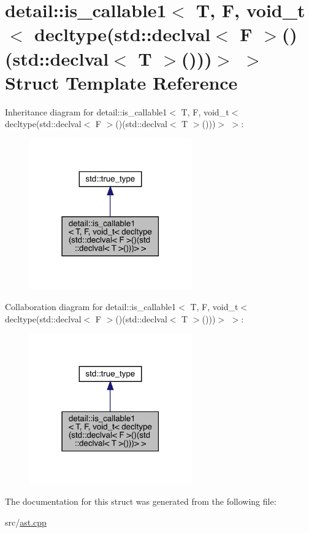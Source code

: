 \hypertarget{structdetail_1_1is__callable1_3_01_t_00_01_f_00_01void__t_3_01decltype_07std_1_1declval_3_01_f_0031734589d10bdb36da443f727c3d6f8}{}\section{detail\+:\+:is\+\_\+callable1$<$ T, F, void\+\_\+t$<$ decltype(std\+:\+:declval$<$ F $>$()(std\+:\+:declval$<$ T $>$()))$>$ $>$ Struct Template Reference}
\label{structdetail_1_1is__callable1_3_01_t_00_01_f_00_01void__t_3_01decltype_07std_1_1declval_3_01_f_0031734589d10bdb36da443f727c3d6f8}


Inheritance diagram for detail\+:\+:is\+\_\+callable1$<$ T, F, void\+\_\+t$<$ decltype(std\+:\+:declval$<$ F $>$()(std\+:\+:declval$<$ T $>$()))$>$ $>$\+:\nopagebreak
\begin{figure}[H]
\begin{center}
\leavevmode
\includegraphics[width=198pt]{structdetail_1_1is__callable1_3_01_t_00_01_f_00_01void__t_3_01decltype_07std_1_1declval_3_01_f_02eecf45c739747a5ac725e91ada95095}
\end{center}
\end{figure}


Collaboration diagram for detail\+:\+:is\+\_\+callable1$<$ T, F, void\+\_\+t$<$ decltype(std\+:\+:declval$<$ F $>$()(std\+:\+:declval$<$ T $>$()))$>$ $>$\+:\nopagebreak
\begin{figure}[H]
\begin{center}
\leavevmode
\includegraphics[width=198pt]{structdetail_1_1is__callable1_3_01_t_00_01_f_00_01void__t_3_01decltype_07std_1_1declval_3_01_f_023610c0cc4f9cd7be59d7d9fd8e554b9}
\end{center}
\end{figure}


The documentation for this struct was generated from the following file\+:\begin{DoxyCompactItemize}
\item 
src/\hyperlink{ast_8cpp}{ast.\+cpp}\end{DoxyCompactItemize}
